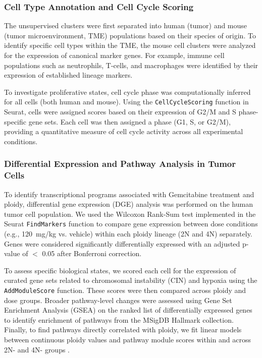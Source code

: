 \documentclass{article}
\begin{document}
\subsubsection{Cell Type Annotation and Cell Cycle Scoring}
The unsupervised clusters were first separated into human (tumor) and mouse (tumor microenvironment, TME) populations based on their species of origin. To identify specific cell types within the TME, the mouse cell clusters were analyzed for the expression of canonical marker genes. For example, immune cell populations such as neutrophils, T-cells, and macrophages were identified by their expression of established lineage markers.

To investigate proliferative states, cell cycle phase was computationally inferred for all cells (both human and mouse). Using the \texttt{CellCycleScoring} function in Seurat, cells were assigned scores based on their expression of G2/M and S phase-specific gene sets. Each cell was then assigned a phase (G1, S, or G2/M), providing a quantitative measure of cell cycle activity across all experimental conditions.


\subsubsection{Differential Expression and Pathway Analysis in Tumor Cells}
To identify transcriptional programs associated with Gemcitabine treatment and ploidy, differential gene expression (DGE) analysis was performed on the human tumor cell population. We used the Wilcoxon Rank-Sum test implemented in the Seurat \texttt{FindMarkers} function to compare gene expression between dose conditions (e.g., 120~mg/kg vs. vehicle) within each ploidy lineage (2N and 4N) separately. Genes were considered significantly differentially expressed with an adjusted p-value of $<$ 0.05 after Bonferroni correction.

To assess specific biological states, we scored each cell for the expression of curated gene sets related to chromosomal instability (CIN) and hypoxia using the \texttt{AddModuleScore} function. These scores were then compared across ploidy and dose groups. Broader pathway-level changes were assessed using Gene Set Enrichment Analysis (GSEA) on the ranked list of differentially expressed genes to identify enrichment of pathways from the MSigDB Hallmark collection. Finally, to find pathways directly correlated with ploidy, we fit linear models between continuous ploidy values and pathway module scores \color{blue} within and across 2N- and 4N- groups \color{black}.
\end{document}
